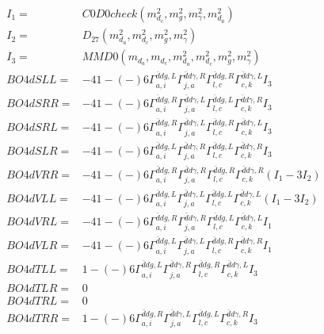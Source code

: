 \documentclass[A4,landscape]{article}
\begin{document}
\begin{align} 
I_1 = & C0D0check(m^2_{d_{{c}}}, m^2_{g}, m^2_{\gamma}, m^2_{d_{{a}}}) \\ 
I_2 = & D_{27}(m^2_{d_{{a}}}, m^2_{d_{{c}}}, m^2_{g}, m^2_{\gamma}) \\ 
I_3 = & MMD0(m_{d_{{a}}}, m_{d_{{c}}}, m^2_{d_{{a}}}, m^2_{d_{{c}}}, m^2_{g}, m^2_{\gamma}) \\ 
  BO4dSLL= & -4   1
-(-)
  6 \Gamma^{\bar{d}d g ,L}_{a, i} \Gamma^{\bar{d}d \gamma ,R}_{j, a} \Gamma^{\bar{d}d g ,R}_{l, c} \Gamma^{\bar{d}d \gamma ,L}_{c, k} I_3 \\ 
  BO4dSRR= & -4   1
-(-)
  6 \Gamma^{\bar{d}d g ,R}_{a, i} \Gamma^{\bar{d}d \gamma ,L}_{j, a} \Gamma^{\bar{d}d g ,L}_{l, c} \Gamma^{\bar{d}d \gamma ,R}_{c, k} I_3 \\ 
  BO4dSRL= & -4   1
-(-)
  6 \Gamma^{\bar{d}d g ,R}_{a, i} \Gamma^{\bar{d}d \gamma ,L}_{j, a} \Gamma^{\bar{d}d g ,R}_{l, c} \Gamma^{\bar{d}d \gamma ,L}_{c, k} I_3 \\ 
  BO4dSLR= & -4   1
-(-)
  6 \Gamma^{\bar{d}d g ,L}_{a, i} \Gamma^{\bar{d}d \gamma ,R}_{j, a} \Gamma^{\bar{d}d g ,L}_{l, c} \Gamma^{\bar{d}d \gamma ,R}_{c, k} I_3 \\ 
  BO4dVRR= & -4   1
-(-)
  6 \Gamma^{\bar{d}d g ,R}_{a, i} \Gamma^{\bar{d}d \gamma ,R}_{j, a} \Gamma^{\bar{d}d g ,R}_{l, c} \Gamma^{\bar{d}d \gamma ,R}_{c, k} (I_1 - 3 I_2) \\ 
  BO4dVLL= & -4   1
-(-)
  6 \Gamma^{\bar{d}d g ,L}_{a, i} \Gamma^{\bar{d}d \gamma ,L}_{j, a} \Gamma^{\bar{d}d g ,L}_{l, c} \Gamma^{\bar{d}d \gamma ,L}_{c, k} (I_1 - 3 I_2) \\ 
  BO4dVRL= & -4   1
-(-)
  6 \Gamma^{\bar{d}d g ,R}_{a, i} \Gamma^{\bar{d}d \gamma ,R}_{j, a} \Gamma^{\bar{d}d g ,L}_{l, c} \Gamma^{\bar{d}d \gamma ,L}_{c, k} I_1 \\ 
  BO4dVLR= & -4   1
-(-)
  6 \Gamma^{\bar{d}d g ,L}_{a, i} \Gamma^{\bar{d}d \gamma ,L}_{j, a} \Gamma^{\bar{d}d g ,R}_{l, c} \Gamma^{\bar{d}d \gamma ,R}_{c, k} I_1 \\ 
  BO4dTLL= &   1
-(-)
  6 \Gamma^{\bar{d}d g ,L}_{a, i} \Gamma^{\bar{d}d \gamma ,R}_{j, a} \Gamma^{\bar{d}d g ,R}_{l, c} \Gamma^{\bar{d}d \gamma ,L}_{c, k} I_3 \\ 
  BO4dTLR= & 0 \\ 
  BO4dTRL= & 0 \\ 
  BO4dTRR= &   1
-(-)
  6 \Gamma^{\bar{d}d g ,R}_{a, i} \Gamma^{\bar{d}d \gamma ,L}_{j, a} \Gamma^{\bar{d}d g ,L}_{l, c} \Gamma^{\bar{d}d \gamma ,R}_{c, k} I_3 \\ 
\end{align} 
\end{document}
